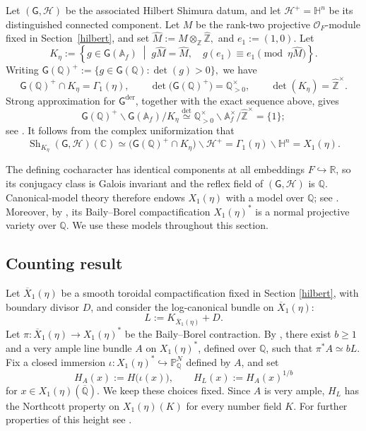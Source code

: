 \documentclass[12 pt]{amsart}
\theoremstyle{definition}
\begin{document}
Let $(\mathsf G,\mathcal H)$ be the associated Hilbert Shimura datum,
and let
\(
\mathcal H^+=\mathbb H^n
\)
be its distinguished connected component. Let $M$ be the rank-two
projective $\mathcal O_F$-module fixed in
Section~\ref{hilbert}, and set
\(
\widehat M:=M\otimes_{\mathbb Z}\widehat{\mathbb Z},
\) and
\(e_1:=(1,0).
\)
Let
\[
K_\eta
:=
\left\{
g\in\mathsf G(\mathbb A_f)
\;\middle|\;
g\widehat M=\widehat M,\quad
g(e_1)\equiv e_1\pmod{\eta\widehat M}
\right\}.
\]
Writing
\(
\mathsf G(\mathbb Q)^+
:=
\{g\in\mathsf G(\mathbb Q):\det(g)>0\},
\)
we have
\[
\mathsf G(\mathbb Q)^+\cap K_\eta=\Gamma_1(\eta),
\qquad
\det\bigl(\mathsf G(\mathbb Q)^+\bigr)=\mathbb Q_{>0}^\times,
\qquad
\det(K_\eta)=\widehat{\mathbb Z}^\times.
\]
Strong approximation for $\mathsf G^{\mathrm{der}}$, together with the
exact sequence above, gives
\[
\mathsf G(\mathbb Q)^+\backslash
\mathsf G(\mathbb A_f)/K_\eta
\overset{\det}{\simeq}
\mathbb Q_{>0}^\times\backslash
\mathbb A_f^\times/\widehat{\mathbb Z}^\times
=
\{1\};
\]
see \cite[Theorem~4.16]{Mil05}.
It follows from the complex uniformization that
\[
\operatorname{Sh}_{K_\eta}(\mathsf G,\mathcal H)(\mathbb C)
\simeq
\bigl(\mathsf G(\mathbb Q)^+\cap K_\eta\bigr)
\backslash\mathcal H^+
=
\Gamma_1(\eta)\backslash\mathbb H^n
=
X_1(\eta).
\]

The defining cocharacter has identical components at all embeddings
$F\hookrightarrow\mathbb R$, so its conjugacy class is Galois
invariant and the reflex field of $(\mathsf G,\mathcal H)$ is
$\mathbb Q$. Canonical-model theory therefore endows $X_1(\eta)$
with a model over $\mathbb Q$; see
\cite[\S\S12--14]{Mil05}. Moreover, by
\cite[Theorem~12.3]{Pin90}, its Baily--Borel compactification
$X_1(\eta)^*$ is a normal projective variety over $\mathbb Q$.
We use these models throughout this section.

\subsection*{Counting result}
Let \(\overline X_1(\eta)\) be a smooth toroidal compactification fixed in Section \ref{hilbert}, with boundary divisor \(D\), and consider the log-canonical bundle on \(\overline X_1(\eta)\):
\[
L:=K_{\overline X_1(\eta)}+D.
\]
Let \(\pi\colon\overline X_1(\eta)\longrightarrow X_1(\eta)^*
\) be the Baily--Borel contraction. By
\cite[Theorem~5.2]{dimitrovtilouine}, there exist
\(b\geq 1\) and a very ample line bundle \(A\) on \(X_1(\eta)^*\), defined
over \(\mathbb Q\), such that
\(
\pi^*A\simeq bL.
\)
Fix a closed immersion
\(
\iota\colon X_1(\eta)^*
\hookrightarrow
\mathbb P^N_{\mathbb Q}
\)
defined by $A$, and set
\[
H_A(x):=H\bigl(\iota(x)\bigr),
\qquad
H_L(x):=H_A(x)^{1/b}
\]
for $x\in X_1(\eta)(\overline{\mathbb Q})$. We keep these choices
fixed. Since $A$ is very ample, $H_L$ has the Northcott
property on $X_1(\eta)(K)$ for every number field $K$. For further properties of this height see \cite[\S 8]{memariansorkhabi2025volumes}.
\end{document}
